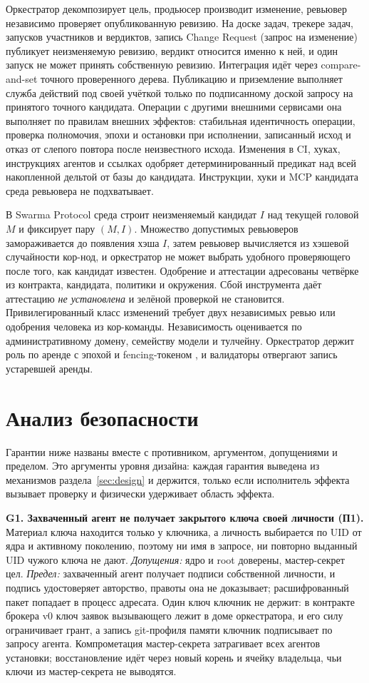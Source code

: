 \documentclass[10pt,a4paper]{article}
\begin{document}
Оркестратор декомпозирует цель, продьюсер производит изменение, ревьювер независимо проверяет опубликованную ревизию. На доске задач, трекере задач, запусков участников и вердиктов, запись Change Request (запрос на изменение) публикует неизменяемую ревизию, вердикт относится именно к ней, и один запуск не может принять собственную ревизию. Интеграция идёт через compare-and-set точного проверенного дерева. Публикацию и приземление выполняет служба действий под своей учёткой только по подписанному доской запросу на принятого точного кандидата. Операции с другими внешними сервисами она выполняет по правилам внешних эффектов: стабильная идентичность операции, проверка полномочия, эпохи и остановки при исполнении, записанный исход и отказ от слепого повтора после неизвестного исхода. Изменения в CI, хуках, инструкциях агентов и ссылках одобряет детерминированный предикат над всей накопленной дельтой от базы до кандидата. Инструкции, хуки и MCP кандидата среда ревьювера не подхватывает.

В Swarma Protocol среда строит неизменяемый кандидат $I$ над текущей головой $M$ и фиксирует пару $(M,I)$. Множество допустимых ревьюверов замораживается до появления хэша $I$, затем ревьювер вычисляется из хэшевой случайности кор-нод, и оркестратор не может выбрать удобного проверяющего после того, как кандидат известен. Одобрение и аттестации адресованы четвёрке из контракта, кандидата, политики и окружения. Сбой инструмента даёт аттестацию \emph{не установлена} и зелёной проверкой не становится. Привилегированный класс изменений требует двух независимых ревью или одобрения человека из кор-команды. Независимость оценивается по административному домену, семейству модели и тулчейну. Оркестратор держит роль по аренде с эпохой и fencing-токеном \cite{chubby,kleppmann-fencing}, и валидаторы отвергают запись устаревшей аренды.

\section{Анализ безопасности}
\label{sec:analysis}

Гарантии ниже названы вместе с противником, аргументом, допущениями и пределом. Это аргументы уровня дизайна: каждая гарантия выведена из механизмов раздела~\ref{sec:design} и держится, только если исполнитель эффекта вызывает проверку и физически удерживает область эффекта.

\textbf{G1. Захваченный агент не получает закрытого ключа своей личности (П1).} Материал ключа находится только у ключника, а личность выбирается по UID от ядра и активному поколению, поэтому ни имя в запросе, ни повторно выданный UID чужого ключа не дают. \emph{Допущения:} ядро и root доверены, мастер-секрет цел. \emph{Предел:} захваченный агент получает подписи собственной личности, и подпись удостоверяет авторство, правоты она не доказывает; расшифрованный пакет попадает в процесс адресата. Один ключ ключник не держит: в контракте брокера v0 ключ заявок вызывающего лежит в доме оркестратора, и его силу ограничивает грант, а запись git-профиля памяти ключник подписывает по запросу агента. Компрометация мастер-секрета затрагивает всех агентов установки; восстановление идёт через новый корень и ячейку владельца, чьи ключи из мастер-секрета не выводятся.
\end{document}
